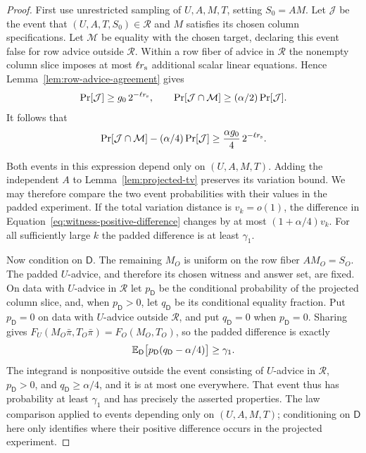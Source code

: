\begin{proof}
First use unrestricted sampling of $U,A,M,T$, setting $S_0=AM$.  Let
$\mathcal J$ be the event that $(U,A,T,S_0)\in\mathcal R$ and $M$ satisfies
its chosen column specifications.  Let $\mathcal M$ be equality with
the chosen target, declaring this event false for row advice outside $\mathcal R$.  Within a
row fiber of advice in $\mathcal R$ the nonempty column slice
imposes at most $\ell r_{\rm s}$ additional scalar linear equations.
Hence Lemma~\ref{lem:row-advice-agreement} gives
\[
 \Pr[\mathcal J]\ge g_0\,2^{-\ell r_{\rm s}},
 \qquad
 \Pr[\mathcal J\cap\mathcal M]\ge(\alpha/2)\Pr[\mathcal J].
\]
It follows that
\begin{equation}
 \Pr[\mathcal J\cap\mathcal M]
       -(\alpha/4)\Pr[\mathcal J]
 \ge\frac{\alpha g_0}{4}\,2^{-\ell r_{\rm s}}.
 \label{eq:witness-positive-difference}
\end{equation}

Both events in this expression depend only on $(U,A,M,T)$.  Adding the
independent $A$ to Lemma~\ref{lem:projected-tv} preserves its variation
bound.  We may therefore compare the two event probabilities with their
values in the padded experiment.  If the total variation distance is
$v_k=o(1)$, the difference in Equation~\eqref{eq:witness-positive-difference}
changes by at most $(1+\alpha/4)v_k$.  For all sufficiently large $k$
the padded difference is at least $\gamma_1$.

Now condition on $\mathsf D$.  The remaining $M_O$ is uniform on the row fiber
$AM_O=S_O$.  The padded
$U$-advice, and therefore its chosen witness and answer set, are fixed.
On data with $U$-advice in $\mathcal R$ let $p_{\mathsf D}$ be the conditional probability of the projected
column slice, and, when $p_{\mathsf D}>0$, let $q_{\mathsf D}$ be its conditional equality
fraction.  Put $p_{\mathsf D}=0$ on data with $U$-advice outside $\mathcal R$, and put $q_{\mathsf D}=0$ when
$p_{\mathsf D}=0$.  Sharing gives
$F_U(M_O\bar\pi,T_O\bar\pi)=F_O(M_O,T_O)$, so the padded difference
is exactly
\[
 \mathbb E_{\mathsf D}\bigl[p_{\mathsf D}(q_{\mathsf D}-\alpha/4)\bigr]\ge\gamma_1.
\]
The integrand is nonpositive outside the event consisting of $U$-advice in $\mathcal R$,
$p_{\mathsf D}>0$, and $q_{\mathsf D}\ge\alpha/4$, and it is at most one everywhere.
That event thus has probability at least $\gamma_1$ and has precisely the
asserted properties.  The law comparison applied to events depending only
on $(U,A,M,T)$; conditioning on $\mathsf D$ here only identifies where their
positive difference occurs in the projected experiment.
\end{proof}

